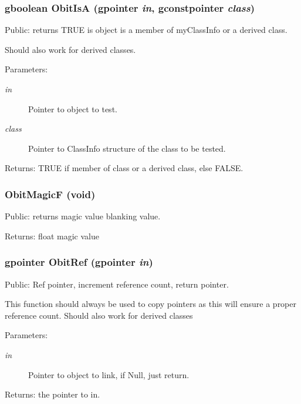 \subsubsection{\setlength{\rightskip}{0pt plus 5cm}gboolean Obit\-Is\-A (gpointer {\em in}, gconstpointer {\em class})}\label{Obit_8c_a10}


Public: returns TRUE is object is a member of my\-Class\-Info or a derived class. 

Should also work for derived classes. \begin{Desc}
\item[Parameters:]
\begin{description}
\item[{\em in}]Pointer to object to test. \item[{\em class}]Pointer to Class\-Info structure of the class to be tested. \end{description}
\end{Desc}
\begin{Desc}
\item[Returns:]TRUE if member of class or a derived class, else FALSE. \end{Desc}
\subsubsection{ Obit\-Magic\-F (void)}\label{Obit_8c_a11}


Public: returns magic value blanking value. 

\begin{Desc}
\item[Returns:]float magic value \end{Desc}
\subsubsection{\setlength{\rightskip}{0pt plus 5cm}gpointer Obit\-Ref (gpointer {\em in})}\label{Obit_8c_a8}


Public: Ref pointer, increment reference count, return pointer. 

This function should always be used to copy pointers as this will ensure a proper reference count. Should also work for derived classes \begin{Desc}
\item[Parameters:]
\begin{description}
\item[{\em in}]Pointer to object to link, if Null, just return. \end{description}
\end{Desc}
\begin{Desc}
\item[Returns:]the pointer to in. \end{Desc}
